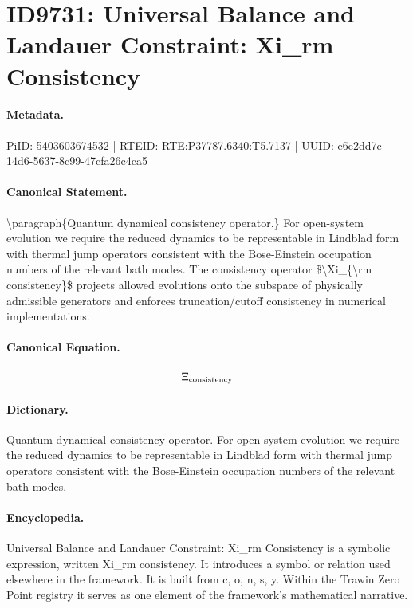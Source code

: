 \section*{ID9731: Universal Balance and Landauer Constraint: Xi\_rm Consistency}
\paragraph{Metadata.}
PiID: 5403603674532 | RTEID: RTE:P37787.6340:T5.7137 | UUID: e6e2dd7c-14d6-5637-8c99-47cfa26c4ca5

\paragraph{Canonical Statement.}
\textbackslash{}paragraph\{Quantum dynamical consistency operator.\} For open-system evolution we require the reduced dynamics to be representable in Lindblad form with thermal jump operators consistent with the Bose-Einstein occupation numbers of the relevant bath modes. The consistency operator \$\textbackslash{}Xi\_\{\textbackslash{}rm consistency\}\$ projects allowed evolutions onto the subspace of physically admissible generators and enforces truncation/cutoff consistency in numerical implementations.

\paragraph{Canonical Equation.}
\[
\Xi_{\rm consistency}
\]

\paragraph{Dictionary.}
Quantum dynamical consistency operator. For open-system evolution we require the reduced dynamics to be representable in Lindblad form with thermal jump operators consistent with the Bose-Einstein occupation numbers of the relevant bath modes.

\paragraph{Encyclopedia.}
Universal Balance and Landauer Constraint: Xi\_rm Consistency is a symbolic expression, written Xi\_rm consistency. It introduces a symbol or relation used elsewhere in the framework. It is built from c, o, n, s, y. Within the Trawin Zero Point registry it serves as one element of the framework's mathematical narrative.
